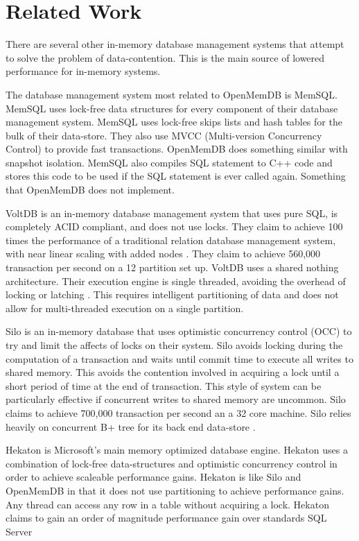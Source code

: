 \documentclass[conference, compsoc]{IEEEtran}
\begin{document}
\section{Related Work}
There are several other in-memory database management systems that attempt to solve the 
problem of data-contention. This is the main source of lowered performance for in-memory systems.
\par\vspace{\baselineskip}
The database management system most related to OpenMemDB is MemSQL.
MemSQL uses lock-free data structures for every component of their database management
system. MemSQL uses lock-free skips lists and hash tables for the bulk of their data-store\cite{MemSQL}.
They also use MVCC (Multi-version Concurrency Control) to provide fast transactions. 
OpenMemDB does something similar with snapshot isolation. MemSQL also compiles SQL
statement to C++ code and stores this code to be used if the SQL statement is ever called
again. Something that OpenMemDB does not implement.
\par\vspace{\baselineskip}
VoltDB is an in-memory database management system that uses pure SQL, is completely ACID
compliant, and does not use locks. They claim to achieve 100 times the performance of 
a traditional relation database management system, with near linear scaling with added nodes \cite{voltdb2010voltdb}. They claim to achieve 560,000 transaction per second on a 12
partition set up. 
VoltDB uses a shared nothing architecture. Their execution engine is single threaded, 
avoiding the overhead of locking or latching \cite{voltdb2010voltdb}. This requires
intelligent partitioning of data and does not allow for multi-threaded execution 
on a single partition. 
\par\vspace{\baselineskip}
Silo is an in-memory database that uses optimistic concurrency control (OCC) to try and 
limit the affects of locks on their system. Silo avoids locking during the computation
of a transaction and waits until commit time to execute all writes to shared memory.
This avoids the contention involved in acquiring a lock until a short period of time 
at the end of transaction. This style of system can be particularly effective if
concurrent writes to shared memory are uncommon. Silo claims to achieve 700,000
transaction per second an a 32 core machine. Silo relies heavily on concurrent 
B+ tree for its back end data-store \cite{tu2013speedy}. 
\par\vspace{\baselineskip}
Hekaton is Microsoft's main memory optimized database engine.
Hekaton uses a combination of lock-free data-structures and optimistic concurrency control
in order to achieve scaleable performance gains. Hekaton is like Silo and OpenMemDB in that 
it does not use partitioning to achieve performance gains. Any thread can access any 
row in a table without acquiring a lock\cite{diaconu2013hekaton}. Hekaton claims to gain
an order of magnitude performance gain over standards SQL Server\cite{diaconu2013hekaton}
\end{document}
